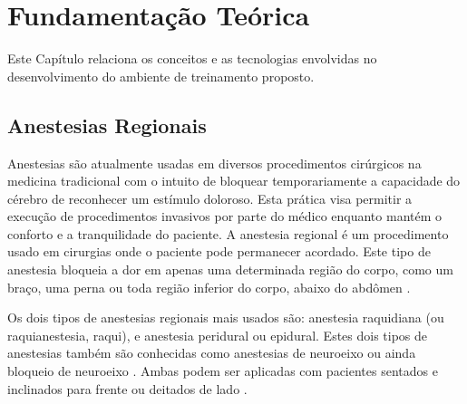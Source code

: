 \chapter{Fundamentação Teórica} \label{cap:cap2}

Este Capítulo relaciona os conceitos e as tecnologias envolvidas no desenvolvimento do ambiente de treinamento proposto. 

\section{Anestesias Regionais}

Anestesias são atualmente usadas em diversos procedimentos cirúrgicos na medicina tradicional com o intuito de bloquear temporariamente a capacidade do cérebro de reconhecer um estímulo doloroso. Esta prática visa permitir a execução de procedimentos invasivos por parte do médico enquanto mantém o conforto e a tranquilidade do paciente. A anestesia regional é um procedimento usado em cirurgias onde o paciente pode permanecer acordado. Este tipo de anestesia bloqueia a dor em apenas uma determinada região do corpo, como um braço, uma perna ou toda região inferior do corpo, abaixo do abdômen \cite{Pinheiro2018}.

Os dois tipos de anestesias regionais mais usados são: anestesia raquidiana (ou raquianestesia, raqui), e anestesia peridural ou epidural. Estes dois tipos de anestesias também são conhecidas como anestesias de neuroeixo ou ainda bloqueio de neuroeixo \cite{Pinheiro2018}. Ambas podem ser aplicadas com pacientes sentados e inclinados para frente ou deitados de lado \cite{Anesclin2019}. 

